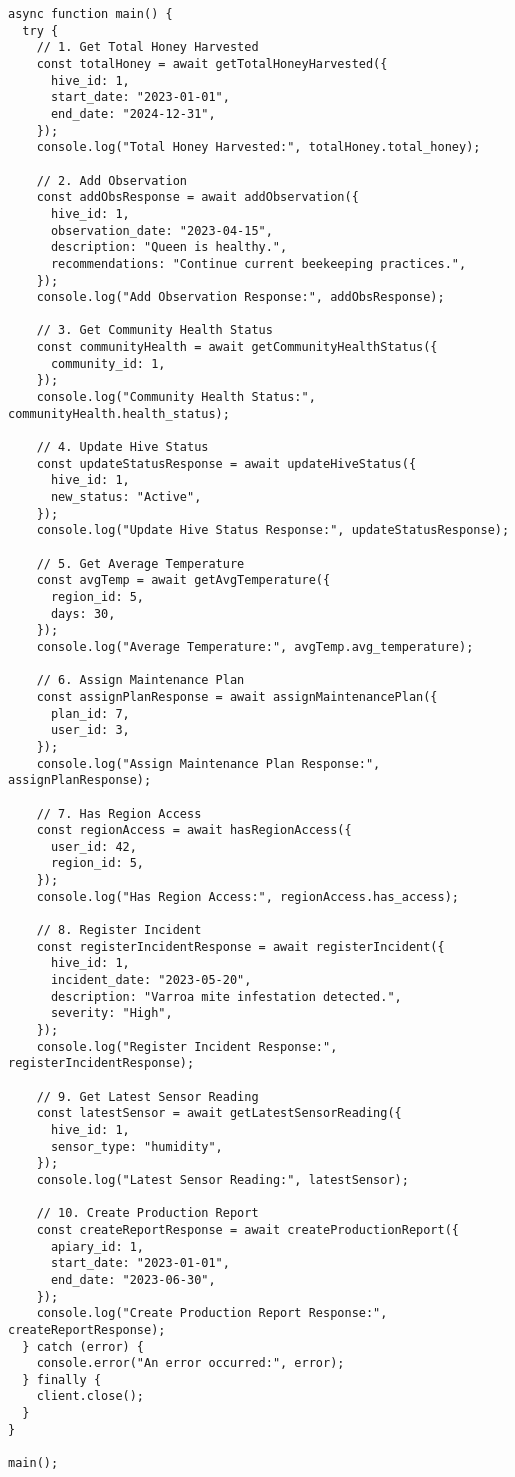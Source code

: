 \documentclass{article}
\begin{document}
\begin{lstlisting}
async function main() {
  try {
    // 1. Get Total Honey Harvested
    const totalHoney = await getTotalHoneyHarvested({
      hive_id: 1,
      start_date: "2023-01-01",
      end_date: "2024-12-31",
    });
    console.log("Total Honey Harvested:", totalHoney.total_honey);

    // 2. Add Observation
    const addObsResponse = await addObservation({
      hive_id: 1,
      observation_date: "2023-04-15",
      description: "Queen is healthy.",
      recommendations: "Continue current beekeeping practices.",
    });
    console.log("Add Observation Response:", addObsResponse);

    // 3. Get Community Health Status
    const communityHealth = await getCommunityHealthStatus({
      community_id: 1,
    });
    console.log("Community Health Status:", communityHealth.health_status);

    // 4. Update Hive Status
    const updateStatusResponse = await updateHiveStatus({
      hive_id: 1,
      new_status: "Active",
    });
    console.log("Update Hive Status Response:", updateStatusResponse);

    // 5. Get Average Temperature
    const avgTemp = await getAvgTemperature({
      region_id: 5,
      days: 30,
    });
    console.log("Average Temperature:", avgTemp.avg_temperature);

    // 6. Assign Maintenance Plan
    const assignPlanResponse = await assignMaintenancePlan({
      plan_id: 7,
      user_id: 3,
    });
    console.log("Assign Maintenance Plan Response:", assignPlanResponse);

    // 7. Has Region Access
    const regionAccess = await hasRegionAccess({
      user_id: 42,
      region_id: 5,
    });
    console.log("Has Region Access:", regionAccess.has_access);

    // 8. Register Incident
    const registerIncidentResponse = await registerIncident({
      hive_id: 1,
      incident_date: "2023-05-20",
      description: "Varroa mite infestation detected.",
      severity: "High",
    });
    console.log("Register Incident Response:", registerIncidentResponse);

    // 9. Get Latest Sensor Reading
    const latestSensor = await getLatestSensorReading({
      hive_id: 1,
      sensor_type: "humidity",
    });
    console.log("Latest Sensor Reading:", latestSensor);

    // 10. Create Production Report
    const createReportResponse = await createProductionReport({
      apiary_id: 1,
      start_date: "2023-01-01",
      end_date: "2023-06-30",
    });
    console.log("Create Production Report Response:", createReportResponse);
  } catch (error) {
    console.error("An error occurred:", error);
  } finally {
    client.close();
  }
}

main();
\end{lstlisting}
\end{document}
